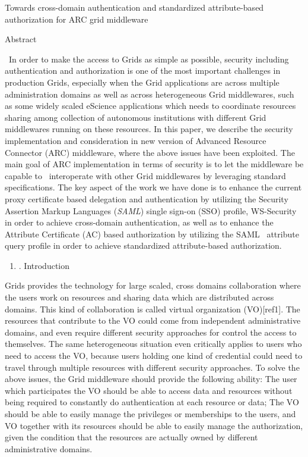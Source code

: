 \documentclass{article}
\title{}
\newcommand\liststyleLi{%
\renewcommand\theenumi{\arabic{enumi}}
\renewcommand\theenumii{\arabic{enumii}}
\renewcommand\theenumiii{\arabic{enumiii}}
\renewcommand\theenumiv{\arabic{enumiv}}
\renewcommand\labelenumi{\theenumi.}
\renewcommand\labelenumii{\theenumii.}
\renewcommand\labelenumiii{\theenumiii.}
\renewcommand\labelenumiv{\theenumiv.}
}
\begin{document}
{\centering
Towards cross-domain authentication and standardized attribute-based
authorization for ARC grid middleware
\par}


\bigskip

{\centering
Abstract
\par}

\ In order to make the access to Grids as simple as possible, security
including authentication and authorization is one of the most important
challenges in production Grids, especially when the Grid applications
are across multiple administration domains as well as across
heterogeneous Grid middlewares, such as some widely scaled eScience
applications which needs to coordinate resources sharing among
collection of autonomous institutions with different Grid middlewares
running on these resources. In this paper, we describe the security
implementation and consideration in new version of Advanced Resource
Connector (ARC) middleware, where the above issues have been exploited.
The main goal of ARC implementation in terms of security is to let the
middleware be capable to \ interoperate with other Grid middlewares by
leveraging standard specifications. The key aspect of the work we have
done is to enhance the current proxy certificate based delegation and
authentication by utilizing the Security Assertion Markup Languages
(\textit{SAML}) single sign-on (SSO) profile, WS-Security in order to
achieve cross-domain authentication, as well as to enhance the
Attribute Certificate (AC) based authorization by utilizing the SAML
\ attribute query profile in order to achieve standardized
attribute-based authorization. \ 


\bigskip

\liststyleLi
\begin{enumerate}
\item[] {. Introduction
\par}
\end{enumerate}
Grids provides the technology for large scaled, cross domains
collaboration where the users work on resources and sharing data which
are distributed across domains. This kind of collaboration is called
virtual organization (VO)[ref1]. The resources that contribute to the
VO could come from independent administrative domains, and even require
different security approaches for control the access to themselves. The
same heterogeneous situation even critically applies to users who need
to access the VO, because users holding one kind of credential could
need to travel through multiple resources with different security
approaches. To solve the above issues, the Grid middleware should
provide the following ability: The user which participates the VO
should be able to access data and resources without being required to
constantly do authentication at each resource or data; The VO should be
able to easily manage the privileges or memberships to the users, and
VO together with its resources should be able to easily manage the
authorization, given the condition that the resources are actually
owned by different administrative domains.
\end{document}
